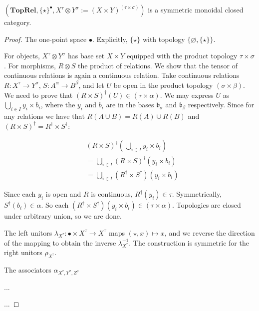\begin{proposition}
$(\mathbf{TopRel},\{\star\}^{\bullet},X^\tau \otimes Y^\sigma := (X \times Y)^{(\tau \times \sigma)})$ is a symmetric monoidal closed category.
\begin{proof}

 The one-point space $\bullet$. Explicitly, $\{\star\}$ with topology $\{\varnothing,\{\star\}\}$.


 For objects, $X^\tau \otimes Y^\sigma$ has base set $X \times Y$ equipped with the product topology $\tau \times \sigma$. For morphisms, $R \otimes S$ the product of relations. We show that the tensor of continuous relations is again a continuous relation. Take continuous relations $R: X^\tau \rightarrow Y^\sigma$, $S: A^\alpha \rightarrow B^\beta$, and let $U$ be open in the product topology $(\sigma \times \beta)$. We need to prove that $(R \times S)^\dag(U) \in (\tau \times \alpha)$. We may express $U$ as $\bigcup\limits_{i \in I} y_i \times b_i$, where the $y_i$ and $b_i$ are in the bases $\mathfrak{b}_\sigma$ and $\mathfrak{b}_\beta$ respectively. Since for any relations we have that $R(A \cup B) = R(A) \cup R(B)$ and $(R \times S)^\dag = R^\dag \times S^\dag$:

\begin{align*}
&(R \times S)^\dag(\bigcup\limits_{i \in I} y_i \times b_i)\\
 &= \bigcup\limits_{i \in I}(R \times S)^\dag(y_i \times b_i)\\
 &= \bigcup\limits_{i \in I}(R^\dag \times S^\dag)(y_i \times b_i)
 \end{align*}

Since each $y_i$ is open and $R$ is continuous, $R^\dag(y_i) \in \tau$. Symmetrically, $S^\dag(b_i) \in \alpha$. So each $(R^\dag \times S^\dag)(y_i \times b_i) \in (\tau \times \alpha)$. Topologies are closed under arbitrary union, so we are done.

 The left unitors $\lambda_{X^{\tau}}: \bullet \times X^\tau \rightarrow X^\tau$ maps $(\star,x) \mapsto x$, and we reverse the direction of the mapping to obtain the inverse $\lambda^{-1}_{X^{\tau}}$. The construction is symmetric for the right unitors $\rho_{X^{\tau}}$. 


The associators $\alpha_{X^{\tau},Y^{\sigma},Z^{\rho}}$


...


...

\end{proof}
\end{proposition}

